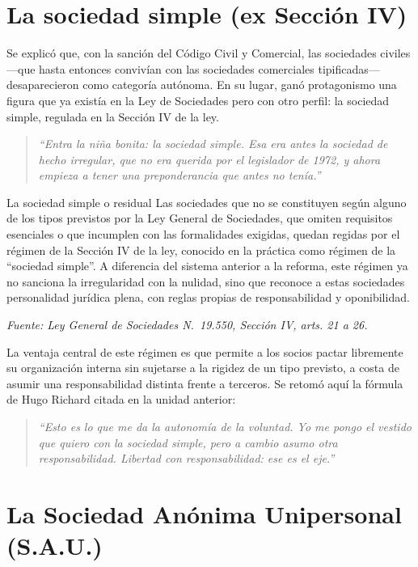 \documentclass[12pt,oneside]{book}
\begin{document}
\section{La sociedad simple (ex Sección IV)}

Se explicó que, con la sanción del Código Civil y Comercial, las sociedades civiles —que hasta entonces convivían con las sociedades comerciales tipificadas— desaparecieron como categoría autónoma. En su lugar, ganó protagonismo una figura que ya existía en la Ley de Sociedades pero con otro perfil: la sociedad simple, regulada en la Sección IV de la ley.

\begin{quote}
\textit{``Entra la niña bonita: la sociedad simple. Esa era antes la sociedad de hecho irregular, que no era querida por el legislador de 1972, y ahora empieza a tener una preponderancia que antes no tenía.''}
\end{quote}

\begin{definition}{La sociedad simple o residual}
Las sociedades que no se constituyen según alguno de los tipos previstos por la Ley General de Sociedades, que omiten requisitos esenciales o que incumplen con las formalidades exigidas, quedan regidas por el régimen de la Sección IV de la ley, conocido en la práctica como régimen de la ``sociedad simple''. A diferencia del sistema anterior a la reforma, este régimen ya no sanciona la irregularidad con la nulidad, sino que reconoce a estas sociedades personalidad jurídica plena, con reglas propias de responsabilidad y oponibilidad.

\textit{Fuente: Ley General de Sociedades N.\textordmasculine~19.550, Sección IV, arts. 21 a 26.}
\end{definition}

La ventaja central de este régimen es que permite a los socios pactar libremente su organización interna sin sujetarse a la rigidez de un tipo previsto, a costa de asumir una responsabilidad distinta frente a terceros. Se retomó aquí la fórmula de Hugo Richard citada en la unidad anterior:

\begin{quote}
\textit{``Esto es lo que me da la autonomía de la voluntad. Yo me pongo el vestido que quiero con la sociedad simple, pero a cambio asumo otra responsabilidad. Libertad con responsabilidad: ese es el eje.''}
\end{quote}

\section{La Sociedad Anónima Unipersonal (S.A.U.)}
\end{document}
